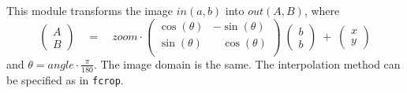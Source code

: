 This module transforms the image $in(a,b)$ into $out(A,B)$, where
$$\left( \begin{array}{c} A \\ B \end{array} \right) \quad
= \quad zoom \cdot 
\left( \begin{array}{cc}  \cos(\theta) & - \sin(\theta) \\
 \sin(\theta) & \;\;\;\cos(\theta) \\ \end{array} \right) \;
\left( \begin{array}{c} b \\ b \end{array} \right) \;+\;
\left( \begin{array}{c} x \\ y  \end{array} \right)$$
and $\displaystyle \theta = angle \cdot \frac{\pi}{180}$.
The image domain is the same. The interpolation method can be specified
as in \verb+fcrop+.

